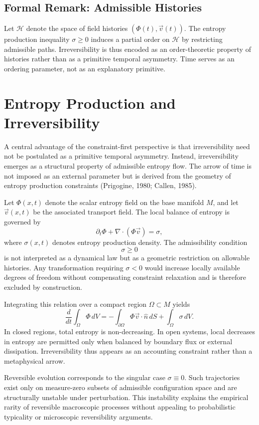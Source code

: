 \documentclass[11pt]{article}
\begin{document}
\subsection*{Formal Remark: Admissible Histories}

Let $\mathcal{H}$ denote the space of field histories $(\Phi(t),\vec{v}(t))$. The entropy production inequality $\sigma \ge 0$ induces a partial order on $\mathcal{H}$ by restricting admissible paths. Irreversibility is thus encoded as an order-theoretic property of histories rather than as a primitive temporal asymmetry. Time serves as an ordering parameter, not as an explanatory primitive.

\bigskip

\section{Entropy Production and Irreversibility}

A central advantage of the constraint-first perspective is that irreversibility need not be postulated as a primitive temporal asymmetry. Instead, irreversibility emerges as a structural property of admissible entropy flow. The arrow of time is not imposed as an external parameter but is derived from the geometry of entropy production constraints (Prigogine, 1980; Callen, 1985).

Let $\Phi(x,t)$ denote the scalar entropy field on the base manifold $M$, and let $\vec{v}(x,t)$ be the associated transport field. The local balance of entropy is governed by
\[
\partial_t \Phi + \nabla \cdot (\Phi \vec{v}) = \sigma,
\]
where $\sigma(x,t)$ denotes entropy production density. The admissibility condition
\[
\sigma \ge 0
\]
is not interpreted as a dynamical law but as a geometric restriction on allowable histories. Any transformation requiring $\sigma < 0$ would increase locally available degrees of freedom without compensating constraint relaxation and is therefore excluded by construction.

Integrating this relation over a compact region $\Omega \subset M$ yields
\[
\frac{d}{dt} \int_\Omega \Phi \, dV
=
- \int_{\partial \Omega} \Phi \vec{v} \cdot \hat{n} \, dS
+ \int_\Omega \sigma \, dV.
\]
In closed regions, total entropy is non-decreasing. In open systems, local decreases in entropy are permitted only when balanced by boundary flux or external dissipation. Irreversibility thus appears as an accounting constraint rather than a metaphysical arrow.

Reversible evolution corresponds to the singular case $\sigma \equiv 0$. Such trajectories exist only on measure-zero subsets of admissible configuration space and are structurally unstable under perturbation. This instability explains the empirical rarity of reversible macroscopic processes without appealing to probabilistic typicality or microscopic reversibility arguments.
\end{document}
